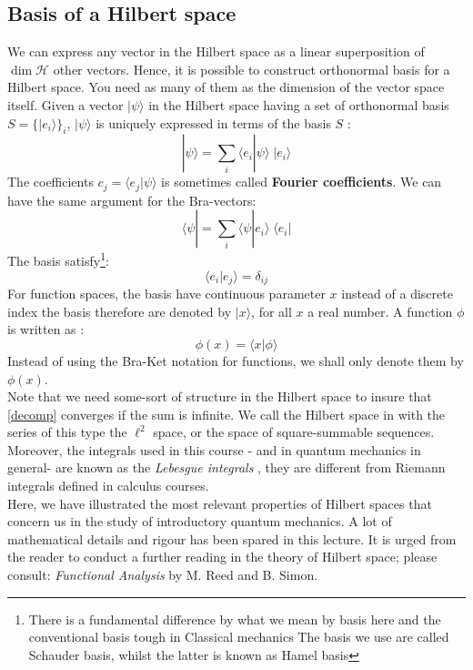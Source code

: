 \subsection{Basis of a Hilbert space}
We can express any vector in the Hilbert space as a linear superposition of $\dim{\mathcal{H}}$ other vectors. Hence, it is possible to construct orthonormal basis for a Hilbert space. You need as many of them as the dimension of the vector space itself. 
Given a vector $ | \psi \rangle$ in the Hilbert space having a set of orthonormal basis $ S= \{ | e_i\rangle\}_i$, $ | \psi \rangle$ is uniquely expressed in terms of the basis $S$ :
\begin{equation}
| \psi \rangle = \sum_i \langle e_i| \psi \rangle \;  |e_i\rangle
\label{decomp}
\end{equation}
The coefficients $ c_j = \langle e_j| \psi \rangle$ is sometimes called \textbf{Fourier coefficients}. We can have the same argument for the Bra-vectors:
\begin{equation}
\langle\psi| = \sum_i \langle \psi| e_i \rangle \;  \langle e_i|
\end{equation}
The basis satisfy\footnote{There is a fundamental difference by what we mean by basis here and the conventional basis tough in Classical mechanics The basis we use are called Schauder basis, whilst the latter is known as Hamel basis}:
\begin{equation}
\langle e_i|e_j\rangle = \delta_{ij}
\end{equation}
For function spaces, the basis have continuous parameter  $x$ instead of a discrete index the basis therefore are denoted by $ |x\rangle$, for all $x$ a real number. A function $ \phi$ is written as :
\[
\phi(x) = \langle x| \phi \rangle
\] 
Instead of using the Bra-Ket notation for functions, we shall only denote them by $ \phi(x)$.\\
Note that we need some-sort of structure in the Hilbert space to insure that \eqref{decomp} converges if the sum is infinite. We call the Hilbert space in with the series of this type the $ \ell^2$ space, or the space of square-summable sequences. Moreover, the integrals used in this course - and in quantum mechanics in general- are known as the \textit{Lebesgue integrals }, they are different from Riemann integrals defined in calculus courses.\\
 Here, we have illustrated the most relevant properties of Hilbert spaces that concern us in the study of introductory quantum mechanics. A lot of mathematical details and rigour has been spared in this lecture. It is urged from the reader to conduct a further reading in the theory of Hilbert space; please consult: \textit{Functional Analysis} by M. Reed and B. Simon.\\
 	 
